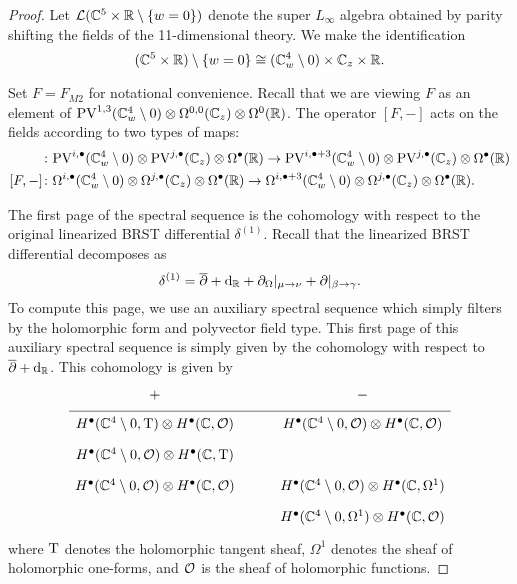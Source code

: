\begin{proof}
Let $\mathcal L(\mathbb C^5 \times \mathbb R \setminus \{w=0\})$ denote the super $L_\infty$ algebra obtained by parity shifting the fields of the 11-dimensional theory. 
We make the identification 
\[
(\mathbb C^5 \times \mathbb R) \setminus \{w=0\} \cong (\mathbb C_w^4 \setminus 0) \times \mathbb C_z \times \mathbb R .
\]

Set $F = F_{M2}$ for notational convenience. Recall that we are viewing $F$ as an element of ${\rm PV}^{1,3}(\mathbb C_w^4 \setminus 0) \otimes \Omega^{0,0}(\mathbb C_z) \otimes \Omega^0(\mathbb R)$. 
The operator $[F,-]$ acts on the fields according to two types of maps:
\begin{align*}
[F ,-] & \colon \PV^{i,\bu}(\CC^4_w \setminus 0) \otimes \PV^{j,\bu} (\CC_z) \otimes \Omega^\bu (\RR) \to \PV^{i,\bu+3}(\CC^4_w \setminus 0) \otimes \PV^{j,\bu} (\CC_z) \otimes \Omega^\bu (\RR) \\
[F,-] & \colon \Omega^{i,\bu}(\CC^4_w \setminus 0) \otimes \Omega^{j,\bu} (\CC_z) \otimes \Omega^\bu (\RR) \to \Omega^{i,\bu+3}(\CC^4_w \setminus 0) \otimes \Omega^{j,\bu} (\CC_z) \otimes \Omega^\bu (\RR).
\end{align*}



The first page of the spectral sequence is the cohomology with respect to the original linearized BRST differential $\delta^{(1)}$. 
Recall that the linearized BRST differential decomposes as
\[
\delta^{(1)} = \overline{\partial} + {\rm d}_{\mathbb R} + \partial_{\Omega} |_{\mu \to \nu} + \partial |_{\beta \to \gamma}  .
\]
To compute this page, we use an auxiliary spectral sequence which simply filters by the holomorphic form and polyvector field type. 
This first page of this auxiliary spectral sequence is simply given by the cohomology with respect to $\overline{\partial} + {\rm d}_{\mathbb R}$. 
This cohomology is given by
\begin{equation}
  \label{eqn:ads4ss} 
  \begin{tikzcd}[row sep = 1 ex]
    + & - \\ \hline
H^\bu(\CC^4\setminus 0, \T) \otimes H^\bu(\CC, \cO) & H^\bu(\CC^4 \setminus 0, \cO) \otimes H^\bu(\CC, \cO) \\
H^\bu(\CC^4\setminus 0, \cO) \otimes H^\bu(\CC, \T) \\
H^\bu(\CC^4\setminus 0, \cO) \otimes H^\bu(\CC, \cO) & H^\bu(\CC^4\setminus 0, \cO) \otimes H^\bu(\CC, \Omega^1) \\ & H^\bu(\CC^4\setminus 0, \Omega^1) \otimes H^\bu(\CC, \cO)  
\end{tikzcd}
\end{equation}
where ${\rm T}$ denotes the holomorphic tangent sheaf, $\Omega^1$ denotes the sheaf of holomorphic one-forms, and $\mathcal O$ is the sheaf of holomorphic functions.


\end{proof}

